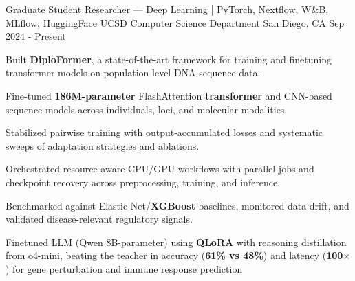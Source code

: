\documentclass[11pt, a4paper]{awesome-cv}
\begin{document}
\begin{cventries}


  \cventry
    {Graduate Student Researcher — Deep Learning | PyTorch, Nextflow, W\&B, MLflow, HuggingFace}
    {UCSD Computer Science Department}
    {San Diego, CA}
    {Sep 2024 - Present}
    {
      \begin{cvitems}
        \item {Built \textbf{DiploFormer}, a state-of-the-art framework for training and finetuning transformer models on population-level DNA sequence data.}
        \item {Fine-tuned \textbf{186M-parameter} FlashAttention \textbf{transformer} and CNN-based sequence models across individuals, loci, and molecular modalities.}
        \item {Stabilized pairwise training with output-accumulated losses and systematic sweeps of adaptation strategies and ablations.}
        \item {Orchestrated resource-aware CPU/GPU workflows with parallel jobs and checkpoint recovery across preprocessing, training, and inference.}
        \item {Benchmarked against Elastic Net/\textbf{XGBoost} baselines, monitored data drift, and validated disease-relevant regulatory signals.}
        \item {Finetuned LLM (Qwen 8B-parameter) using \textbf{QLoRA} with reasoning distillation from o4-mini, beating the teacher in accuracy (\textbf{61\% vs 48\%}) and latency (\textbf{100$\times$}) for gene perturbation and immune response prediction}
      \end{cvitems}
    }


\end{cventries}
\end{document}
